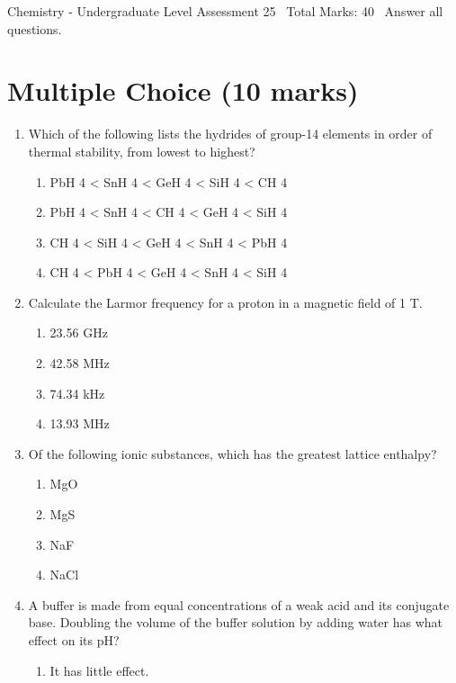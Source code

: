 \documentclass[12pt]{article}
\begin{document}
\begin{center}
Chemistry - Undergraduate Level Assessment 25 \
Total Marks: 40 \
Answer all questions.
\end{center}

\section*{Multiple Choice (10 marks)}
\begin{enumerate}[label=\arabic*.]
\item Which of the following lists the hydrides of group-14 elements in order of thermal stability, from lowest to highest?
\begin{enumerate}[label=(\alph*)]
    \item PbH 4 \textless{} SnH 4 \textless{} GeH 4 \textless{} SiH 4 \textless{} CH 4
    \item PbH 4 \textless{} SnH 4 \textless{} CH 4 \textless{} GeH 4 \textless{} SiH 4
    \item CH 4 \textless{} SiH 4 \textless{} GeH 4 \textless{} SnH 4 \textless{} PbH 4
    \item CH 4 \textless{} PbH 4 \textless{} GeH 4 \textless{} SnH 4 \textless{} SiH 4
\end{enumerate}
\item Calculate the Larmor frequency for a proton in a magnetic field of 1 T.
\begin{enumerate}[label=(\alph*)]
    \item 23.56 GHz
    \item 42.58 MHz
    \item 74.34 kHz
    \item 13.93 MHz
\end{enumerate}
\item Of the following ionic substances, which has the greatest lattice enthalpy?
\begin{enumerate}[label=(\alph*)]
    \item MgO
    \item MgS
    \item NaF
    \item NaCl
\end{enumerate}
\item A buffer is made from equal concentrations of a weak acid and its conjugate base. Doubling the volume of the buffer solution by adding water has what effect on its pH?
\begin{enumerate}[label=(\alph*)]
    \item It has little effect.

\end{enumerate}
\end{enumerate}
\end{document}
